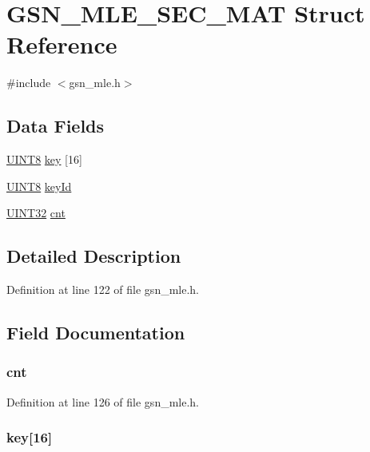 \hypertarget{a00153}{
\section{GSN\_\-MLE\_\-SEC\_\-MAT Struct Reference}
\label{a00153}
}


{\ttfamily \#include $<$gsn\_\-mle.h$>$}

\subsection*{Data Fields}
\begin{DoxyCompactItemize}
\item 
\hyperlink{a00660_gab27e9918b538ce9d8ca692479b375b6a}{UINT8} \hyperlink{a00153_a5c60ebac2170081274a0361f9abce0e2}{key} \mbox{[}16\mbox{]}
\item 
\hyperlink{a00660_gab27e9918b538ce9d8ca692479b375b6a}{UINT8} \hyperlink{a00153_a0ac00f9d4c8c313ac0e64a514b6c3d3c}{keyId}
\item 
\hyperlink{a00660_gae1e6edbbc26d6fbc71a90190d0266018}{UINT32} \hyperlink{a00153_aec51809f7a36ef20d9dbc780b8bfe5cc}{cnt}
\end{DoxyCompactItemize}


\subsection{Detailed Description}


Definition at line 122 of file gsn\_\-mle.h.



\subsection{Field Documentation}
\hypertarget{a00153_aec51809f7a36ef20d9dbc780b8bfe5cc}{
\subsubsection[{cnt}]{ {\bf cnt}}}
\label{a00153_aec51809f7a36ef20d9dbc780b8bfe5cc}


Definition at line 126 of file gsn\_\-mle.h.

\hypertarget{a00153_a5c60ebac2170081274a0361f9abce0e2}{
\subsubsection[{key}]{ {\bf key}\mbox{[}16\mbox{]}}}
\label{a00153_a5c60ebac2170081274a0361f9abce0e2}



